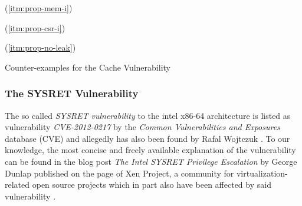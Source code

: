 \begin{table}
    \begin{subtable}{\textwidth}
        \centering
        
        \caption{ (\ref{itm:prop-mem-i})}
        \label{tbl:cex-mem-i-cache-vuln}
    \end{subtable}

    \begin{subtable}{\textwidth}
        \centering
        
        \caption{ (\ref{itm:prop-csr-i})}
        \label{tbl:cex-csr-i-cache-vuln}
    \end{subtable}

    \begin{subtable}{\textwidth}
        \centering
        
        \caption{ (\ref{itm:prop-no-leak})}
        \label{tbl:cex-no-leak-cache-vuln}
    \end{subtable}
    \caption{Counter-examples for the Cache Vulnerability}
    \label{tbl:cex-cache-vuln}
\end{table}

\subsubsection{The SYSRET Vulnerability}

The so called \textit{SYSRET vulnerability} to the intel x86-64 architecture is listed as vulnerability \textit{CVE-2012-0217} by the \textit{Common Vulnerabilities and Exposures} database (CVE\textsuperscript{\textregistered}) \cite{SYSRET-vuln} and allegedly has also been found by Rafal Wojtczuk \cite{SYSRETFreeBSD,SYSRETDebian,SYSRETCert}.
To our knowledge, the most concise and freely available explanation of the vulnerability can be found in the blog post \textit{The Intel SYSRET Privilege Escalation} by George Dunlap published on the page of Xen Project, a community for virtualization-related open source projects which in part also have been affected by said vulnerability \cite{Dunlap19}.

